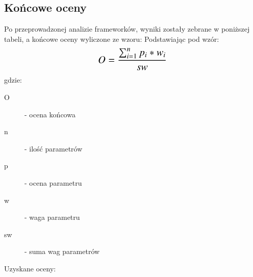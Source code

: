 \documentclass[12pt]{report}
\begin{document}
    \subsection{Końcowe oceny}
      Po przeprowadzonej analizie frameworków, wyniki zostały zebrane w poniższej tabeli, a końcowe oceny wyliczone ze wzoru:
      Podstawiając pod wzór:
      \newline
      \[\text{\Large$O = \frac{\sum_{i=1}^{n} p_{i} * w_{i}}{sw}$}\]
      \newline
      \newline
      gdzie:
      \begin{description}
        \item[O] - ocena końcowa
        \item[n] - ilość parametrów
        \item[p] - ocena parametru
        \item[w] - waga parametru
        \item[sw] - suma wag parametrów
      \end{description}

      Uzyskane oceny:
      \newline
      \newline
      \newline
      \newline
      \newline
      \newline
      \newline
      \newline
      \begingroup
\end{document}
